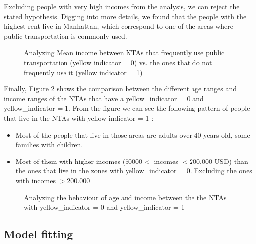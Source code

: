 Excluding people with very high incomes from the analysis, we can reject the stated hypothesis. Digging into more details, we found that the people with the highest rent live in Manhattan, which correspond to one of the areas where public transportation is commonly used.

\begin{figure}%
\centering
{}
\qquad
{}
\caption{Analyzing Mean income between NTAs that frequently use public transportation (yellow indicator = 0) vs. the ones that do not frequently use it  (yellow indicator = 1)}
\label{fig:incomesNTA}%
\end{figure}



Finally, Figure \ref{fig:age_incomesNTA} shows the comparison between the different age ranges and income ranges of the NTAs that have a yellow\_indicator = 0 and yellow\_indicator = 1. From the figure we can see the following pattern of people that live in the NTAs with yellow indicator = 1 :

\begin{itemize}
\item Most of the people that live in those areas are adults over 40 years old, some families with children.
\item Most of them with higher incomes ($50000<$ incomes $< 200.000$ USD) than the ones that live in the zones with yellow\_indicator = $0$. Excluding the ones with incomes $> 200.000$

\end{itemize}

 
\begin{figure}%
\centering
{}
\qquad
{}
\caption{Analyzing the behaviour of age and income between the the NTAs with yellow\_indicator = 0 and yellow\_indicator = 1}
\label{fig:age_incomesNTA}%
\end{figure}


\subsection{Model fitting}

